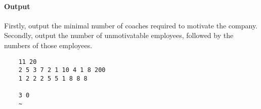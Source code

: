 \paragraph*{Output}

Firstly, output the minimal number of coaches required to motivate the company.
Secondly, output the number of unmotivatable employees, followed by the numbers of those employees.


\begin{samples}
  \begin{verbatim}
    11 20
    2 5 3 7 2 1 10 4 1 8 200
    1 2 2 2 5 5 1 8 8 8

    3 0
    ~
  \end{verbatim}
\end{samples}


